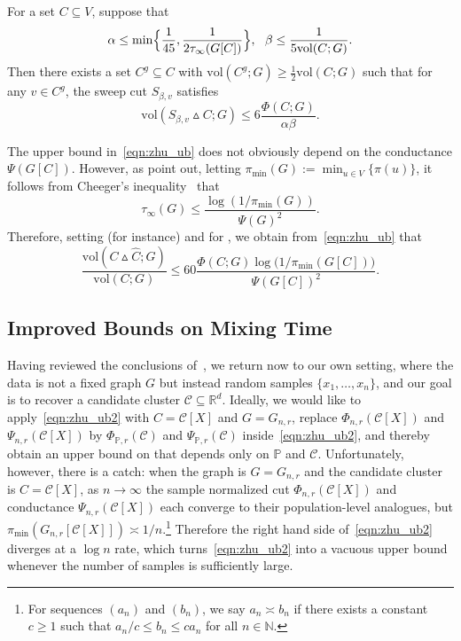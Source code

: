 \documentclass[twoside,11pt]{article}
\newcommand{\Reals}{\mathbb{R}}
\newcommand{\1}{\mathbf{1}}
\newcommand{\Rd}{\Reals^d}
\newcommand{\mc}[1]{\mathcal{#1}}
\newcommand{\mbb}[1]{\mathbb{#1}}
\newcommand{\Pbb}{\mathbb{P}}
\newcommand{\wh}[1]{\widehat{#1}}
\newcommand{\vol}{\mathrm{vol}}
\begin{document}
\begin{lemma}
	\label{lem:zhu}
	For a set $C \subseteq V$, suppose that
	\begin{equation}
	\label{eqn:zhu_condition}
	\alpha \leq \min\Bigl\{\frac{1}{45}, \frac{1}{2\tau_{\infty}(G[C])}\Bigr\},~~ \beta \leq \frac{1}{5\vol(C;G)}.
	\end{equation}
	Then there exists a set $C^g \subseteq C$ with $\vol(C^g;G) \geq \frac{1}{2}\vol(C;G)$ such that for any $v \in C^g$, the sweep cut $S_{\beta,v}$ satisfies
	\begin{equation}
	\label{eqn:zhu_ub}
	\vol(S_{\beta,v} \vartriangle C;G) \leq 6\frac{\Phi(C;G)}{\alpha \beta}.
	\end{equation}
\end{lemma}
The upper bound in~\eqref{eqn:zhu_ub} does not obviously depend on the conductance $\Psi(G[C])$. However, as \cite{zhu2013} point out, letting $\pi_{\min}(G) := \min_{u \in V}\{\pi(u)\}$, it follows from Cheeger's inequality~\citep{chung1997} that 
\begin{equation}
\label{eqn:mixing_time_cheeger}
\tau_{\infty}(G) \leq \frac{\log(1/\pi_{\min}(G))}{\Psi(G)^2}.
\end{equation}
Therefore, setting (for instance)  and \smash{$\wh{C} = S_{\beta_0,v}$} for \smash{$\beta_0 = \frac{1}{5 \vol(C;G)}$}, we obtain from~\eqref{eqn:zhu_ub} that 
\begin{equation}
\label{eqn:zhu_ub2}
\frac{\vol(C \vartriangle \wh{C};G)}{\vol(C; G)} \leq 60\frac{\Phi(C;G) \log\bigl( 1/\pi_{\min}(G[C])\bigr)}{\Psi(G[C])^2}.
\end{equation}

\subsection{Improved Bounds on Mixing Time} 
\label{subsec:mixing_time}
Having reviewed the conclusions of~\cite{zhu2013}, we return now to our own setting, where the data is not a fixed graph $G$ but instead random samples $\{x_1,\ldots,x_n\}$, and our goal is to recover a candidate cluster $\mc{C} \subseteq \Rd$. Ideally, we would like to apply~\eqref{eqn:zhu_ub2} with $C = \mc{C}[X]$ and $G = G_{n,r}$, replace $\Phi_{n,r}(\mc{C}[X])$ and $\Psi_{n,r}(\mc{C}[X])$ by $\Phi_{\Pbb,r}(\mc{C})$ and $\Psi_{\Pbb,r}(\mc{C})$ inside~\eqref{eqn:zhu_ub2}, and thereby obtain an upper bound on \smash{$\Delta(\wh{C};\mc{C}[X])$} that depends only on $\Pbb$ and $\mc{C}$. Unfortunately, however, there is a catch: when the graph is $G = G_{n,r}$ and the candidate cluster is $C = \mc{C}[X]$, as $n \to \infty$ the sample normalized cut $\Phi_{n,r}(\mc{C}[X])$ and conductance $\Psi_{n,r}(\mc{C}[X])$ each converge to their population-level analogues, but $\pi_{\min}(G_{n,r}[\mc{C}[X]]) \asymp 1/n$.\footnote{For sequences $(a_n)$ and $(b_n)$, we say $a_n \asymp b_n$ if there exists a constant $c \geq 1$ such that $a_n/c \leq b_n \leq c a_n$ for all $n \in \mbb{N}$.} Therefore the right hand side of~\eqref{eqn:zhu_ub2} diverges at a $\log n$ rate, which turns~\eqref{eqn:zhu_ub2} into a vacuous upper bound whenever the number of samples is sufficiently large.
\end{document}
